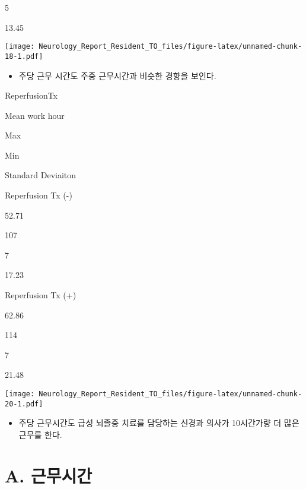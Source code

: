 \documentclass[]{book}
\providecommand{\tightlist}{%
  \setlength{\itemsep}{0pt}\setlength{\parskip}{0pt}}
\begin{document}
5

13.45

\texttt{[image: Neurology\_Report\_Resident\_TO\_files/figure-latex/unnamed-chunk-18-1.pdf]}

\begin{itemize}
\tightlist
\item
  주당 근무 시간도 주중 근무시간과 비슷한 경향을 보인다.
\end{itemize}

ReperfusionTx

Mean work hour

Max

Min

Standard Deviaiton

Reperfusion Tx (-)

52.71

107

7

17.23

Reperfusion Tx (+)

62.86

114

7

21.48

\texttt{[image: Neurology\_Report\_Resident\_TO\_files/figure-latex/unnamed-chunk-20-1.pdf]}

\begin{itemize}
\tightlist
\item
  주당 근무시간도 급성 뇌졸중 치료를 담당하는 신경과 의사가 10시간가량 더 많은 근무를 한다.
\end{itemize}

\hypertarget{a.--1}{%
\section{A. 근무시간}\label{a.--1}}


\end{document}

